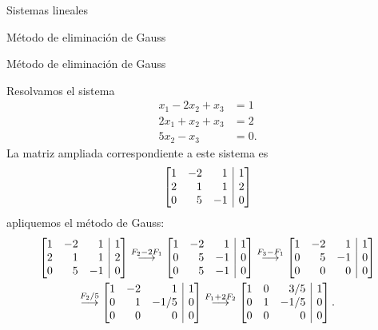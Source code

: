 \begin{chapter}{Sistemas lineales}
\begin{section}{Método de eliminación de Gauss }
\begin{subsection}{Método de eliminación de Gauss}
    \begin{ejemplo*} Resolvamos el sistema
        \begin{align*}
        x_1 -2x_2 + x_3  &= 1\\
        2x_1 +x_2 + x_3  &= 2\\
        5x_2 - x_3  &= 0.
        \end{align*}
        La matriz  ampliada  correspondiente a este sistema es
        \begin{equation*}
            \left[\begin{array}{@{}*{3}{r}|r@{}} 
            1 & -2 & 1 &  1 \\ 2 & 1 & 1 &  2 \\ 0 & 5 & -1 &  0 
        \end{array}\right]
        \end{equation*}
        apliquemos el método de Gauss:
        \begin{multline*}
        \left[\begin{array}{@{}*{3}{r}|r@{}}1 & -2 & 1 &  1 \\ 2 & 1 & 1 &  2 \\	0 & 5 & -1 &  0  \end{array}\right]
        \stackrel{F_2 - 2F_1}{\longrightarrow} 
        \left[\begin{array}{@{}*{3}{r}|r@{}}1 & -2 & 1 &  1 \\ 0 & 5 & -1 &  0 \\	0 & 5 & -1 &  0  \end{array}\right]
        \stackrel{F_3-F_1}{\longrightarrow} 
        \left[\begin{array}{@{}*{3}{r}|r@{}}1 & -2 & 1 &  1 \\ 0 & 5 & -1 &  0 \\	0 & 0 & 0 & 0  \end{array}\right]
        \\
        \stackrel{F_2/5}{\longrightarrow} 
        \left[\begin{array}{@{}*{3}{r}|r@{}}1 & -2 & 1 &  1 \\ 0 & 1 & -1/5 &  0 \\	0 & 0 & 0 &  0  \end{array}\right]
        \stackrel{F_1+2 F_2}{\longrightarrow} 
        \left[\begin{array}{@{}*{3}{r}|r@{}}1 & 0 & 3/5 & 1 \\ 0 & 1 & -1/5 &  0 \\	0 & 0 & 0 &  0  \end{array}\right].

\end{multline*}
\end{ejemplo*}
\end{subsection}
\end{section}
\end{chapter}

